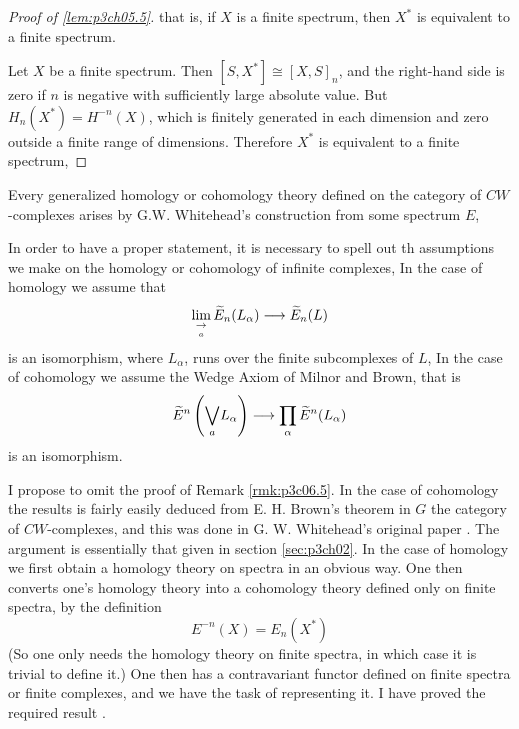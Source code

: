 \documentclass[../main]{subfiles}
\begin{document}
\begin{proof}[Proof of \ref{lem:p3ch05.5}]
that is, if $X$ is a finite spectrum, then $X^\ast$ is equivalent to a finite spectrum.

Let $X$ be a finite spectrum. Then $\left[ S, X^\ast \right]\cong [X, S]_n$, and the right-hand side is zero if $n$ is negative with sufficiently large absolute value. But $H_n(X^\ast)=H^{-n}(X)$, which is finitely generated in each dimension and zero outside a finite range of dimensions. Therefore $X^\ast$ is equivalent to a finite spectrum, 
\end{proof}

\begin{remark}\label{rmk:p3c06.5}
Every generalized homology or cohomology theory defined on the category of $CW$-complexes arises by G.W. Whitehead’s construction from some spectrum $E$, 
\end{remark}

In order to have a proper statement, it is necessary to spell out th assumptions we make on the homology or cohomology of infinite complexes, In the case of homology we assume that
\[\lim_{\underset{a}{\to}} \widetilde{E}_n(L_\alpha) \longrightarrow \widetilde{E}_n(L)\]
is an isomorphism, where $L_\alpha$, runs over the finite subcomplexes of $L$, In the case of cohomology we assume the Wedge Axiom of Milnor and Brown, that is
\[\widetilde{E}^n\left( \underset{a}{\bigvee}L_\alpha \right) \longrightarrow \prod_\alpha\widetilde{E}^n(L_\alpha)\]
is an isomorphism.

I propose to omit the proof of Remark \ref{rmk:p3c06.5}. In the case of cohomology the results is fairly easily deduced from E. H. Brown's theorem in $G$ the category of $CW$-complexes, and this was done in G. W. Whitehead's original paper \plscite{[17]}. The argument is essentially that given in section \ref{sec:p3ch02}. In the case of homology we first obtain a homology theory on spectra in an obvious way. One then converts one's homology theory into a cohomology theory defined only on finite spectra, by the definition
\[E^{-n}(X)=E_n(X^\ast)\]
(So one only needs the homology theory on finite spectra, in which case it is trivial to define it.) One then has a contravariant functor defined on finite spectra or finite complexes, and we have the task of representing it. I have proved the required result .
\end{document}
